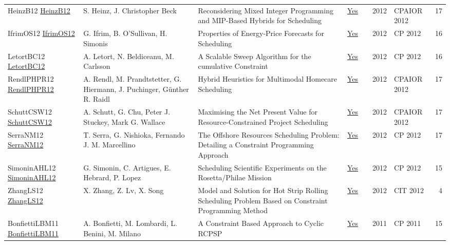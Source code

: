{\begin{longtable}{p{3cm}p{6cm}p{7cm}rrrp{3cm}r}
HeinzB12 \href{https://doi.org/10.1007/978-3-642-29828-8\_14}{HeinzB12} & S. Heinz, J. Christopher Beck & Reconsidering Mixed Integer Programming and MIP-Based Hybrids for Scheduling & \href{papers/HeinzB12.pdf}{Yes} & \cite{HeinzB12} & 2012 & CPAIOR 2012 & 17\\
IfrimOS12 \href{https://doi.org/10.1007/978-3-642-33558-7\_68}{IfrimOS12} & G. Ifrim, B. O'Sullivan, H. Simonis & Properties of Energy-Price Forecasts for Scheduling & \href{papers/IfrimOS12.pdf}{Yes} & \cite{IfrimOS12} & 2012 & CP 2012 & 16\\
LetortBC12 \href{https://doi.org/10.1007/978-3-642-33558-7\_33}{LetortBC12} & A. Letort, N. Beldiceanu, M. Carlsson & A Scalable Sweep Algorithm for the cumulative Constraint & \href{papers/LetortBC12.pdf}{Yes} & \cite{LetortBC12} & 2012 & CP 2012 & 16\\
RendlPHPR12 \href{https://doi.org/10.1007/978-3-642-29828-8\_22}{RendlPHPR12} & A. Rendl, M. Prandtstetter, G. Hiermann, J. Puchinger, G{\"{u}}nther R. Raidl & Hybrid Heuristics for Multimodal Homecare Scheduling & \href{papers/RendlPHPR12.pdf}{Yes} & \cite{RendlPHPR12} & 2012 & CPAIOR 2012 & 17\\
SchuttCSW12 \href{https://doi.org/10.1007/978-3-642-29828-8\_24}{SchuttCSW12} & A. Schutt, G. Chu, Peter J. Stuckey, Mark G. Wallace & Maximising the Net Present Value for Resource-Constrained Project Scheduling & \href{papers/SchuttCSW12.pdf}{Yes} & \cite{SchuttCSW12} & 2012 & CPAIOR 2012 & 17\\
SerraNM12 \href{https://doi.org/10.1007/978-3-642-33558-7\_59}{SerraNM12} & T. Serra, G. Nishioka, Fernando J. M. Marcellino & The Offshore Resources Scheduling Problem: Detailing a Constraint Programming Approach & \href{papers/SerraNM12.pdf}{Yes} & \cite{SerraNM12} & 2012 & CP 2012 & 17\\
SimoninAHL12 \href{https://doi.org/10.1007/978-3-642-33558-7\_5}{SimoninAHL12} & G. Simonin, C. Artigues, E. Hebrard, P. Lopez & Scheduling Scientific Experiments on the Rosetta/Philae Mission & \href{papers/SimoninAHL12.pdf}{Yes} & \cite{SimoninAHL12} & 2012 & CP 2012 & 15\\
ZhangLS12 \href{https://doi.org/10.1109/CIT.2012.96}{ZhangLS12} & X. Zhang, Z. Lv, X. Song & Model and Solution for Hot Strip Rolling Scheduling Problem Based on Constraint Programming Method & \href{papers/ZhangLS12.pdf}{Yes} & \cite{ZhangLS12} & 2012 & CIT 2012 & 4\\
BonfiettiLBM11 \href{https://doi.org/10.1007/978-3-642-23786-7\_12}{BonfiettiLBM11} & A. Bonfietti, M. Lombardi, L. Benini, M. Milano & A Constraint Based Approach to Cyclic {RCPSP} & \href{papers/BonfiettiLBM11.pdf}{Yes} & \cite{BonfiettiLBM11} & 2011 & CP 2011 & 15\\

\end{longtable}}
